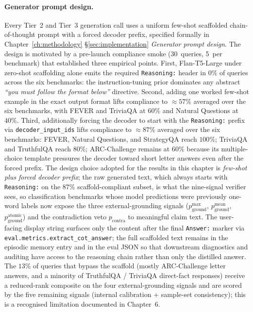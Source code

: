 \paragraph{Generator prompt design.}
Every Tier~2 and Tier~3 generation call uses a uniform few-shot
scaffolded chain-of-thought prompt with a forced decoder prefix,
specified formally in Chapter~\ref{ch:methodology} \S\ref{sec:implementation}
\emph{Generator prompt design}. The design is motivated by a
pre-launch compliance smoke (30~queries, 5~per benchmark) that
established three empirical points. First, Flan-T5-Large under
zero-shot scaffolding alone emits the required \texttt{Reasoning:}
header in $0\%$ of queries across the six benchmarks: the
instruction-tuning prior dominates any abstract \textit{``you must
follow the format below''} directive. Second, adding one worked
few-shot example in the exact output format lifts compliance to
$\approx 57\%$ averaged over the six benchmarks, with FEVER and
TriviaQA at $60\%$ and Natural Questions at $40\%$. Third,
additionally forcing the decoder to start with the \texttt{Reasoning:}
prefix via \texttt{decoder\_input\_ids} lifts compliance to
$\approx 87\%$ averaged over the six benchmarks: FEVER, Natural
Questions, and StrategyQA reach $100\%$; TriviaQA and TruthfulQA
reach $80\%$; ARC-Challenge remains at $60\%$ because its
multiple-choice template pressures the decoder toward short letter
answers even after the forced prefix.
The design choice adopted for the results in this chapter is
\emph{few-shot plus forced decoder prefix}; the raw generated text,
which always starts with \texttt{Reasoning:} on the $87\%$
scaffold-compliant subset, is what the nine-signal verifier sees, so
classification benchmarks whose model predictions were previously
one-word labels now expose the three external-grounding signals
($p_{\text{ground}}^{\text{max}}$, $p_{\text{ground}}^{\text{mean}}$,
$p_{\text{ground}}^{\text{atomic}}$) and the contradiction veto
$p_{\text{contra}}$ to meaningful claim text. The user-facing
display string surfaces only the content after the final
\texttt{Answer:} marker via \texttt{eval.metrics.extract\_cot\_answer};
the full scaffolded text remains in the episodic memory entry and in
the eval JSON so that downstream diagnostics and auditing have access
to the reasoning chain rather than only the distilled answer. The
$13\%$ of queries that bypass the scaffold (mostly ARC-Challenge
letter answers, and a minority of TruthfulQA / TriviaQA direct-fact
responses) receive a reduced-rank composite on the four
external-grounding signals and are scored by the five remaining
signals (internal calibration + sample-set consistency); this is a
recognised limitation documented in Chapter~6.

